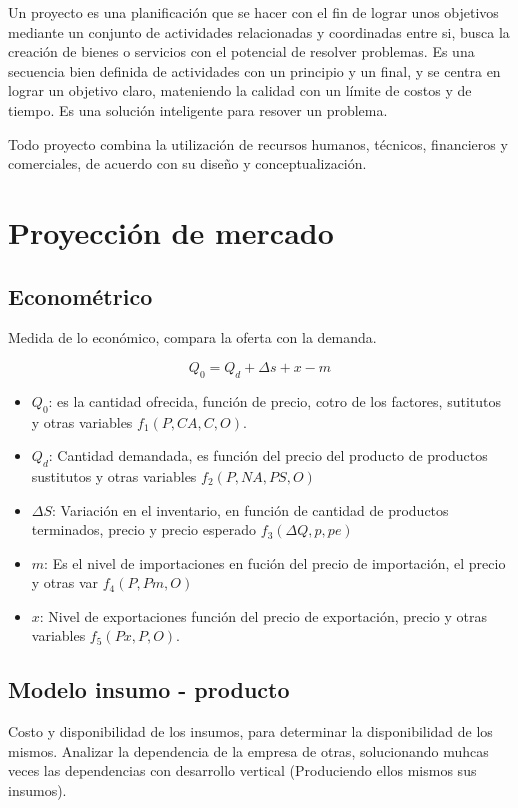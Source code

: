 \documentclass[a4paper, 11pt, oneside]{article}
\begin{document}
Un proyecto es una planificación que se hacer con el fin de lograr unos objetivos mediante un
conjunto de actividades relacionadas y coordinadas entre si, busca la creación de bienes o 
servicios con el potencial de resolver problemas. Es una secuencia bien definida de actividades
con un principio y un final, y se centra en lograr un objetivo claro, mateniendo la calidad
con un límite de costos y de tiempo. Es una solución inteligente para resover un problema.

Todo proyecto combina la utilización de recursos humanos, técnicos, financieros y comerciales,
de acuerdo con su diseño y conceptualización.

\section{Proyección de mercado}

\subsection{Econométrico}

Medida de lo económico, compara la oferta con la demanda.

\[Q_0 = Q_d + \Delta s + x - m \]

\begin{itemize}
	\item $Q_0$: es la cantidad ofrecida, función de precio, cotro de los factores, sutitutos y otras variables $f_1(P,CA,C,O)$.
	\item $Q_d$: Cantidad demandada, es función del precio del producto de productos sustitutos y otras variables $f_2(P,NA,PS,O)$
	\item $\Delta S$: Variación en el inventario, en función de cantidad de productos terminados, precio y precio esperado $f_3(\Delta Q, p, pe)$
	\item $m$: Es el nivel de importaciones en fución del precio de importación, el precio y otras var $f_4(P, Pm, O)$
	\item $x$: Nivel de exportaciones función del precio de exportación, precio y otras variables $f_5(Px,P,O)$.
\end{itemize}

\subsection{Modelo insumo - producto}

Costo y disponibilidad de los insumos, para determinar la disponibilidad de los mismos. Analizar la dependencia
de la empresa de otras, solucionando muhcas veces las dependencias con desarrollo vertical (Produciendo ellos
mismos sus insumos).
\end{document}
